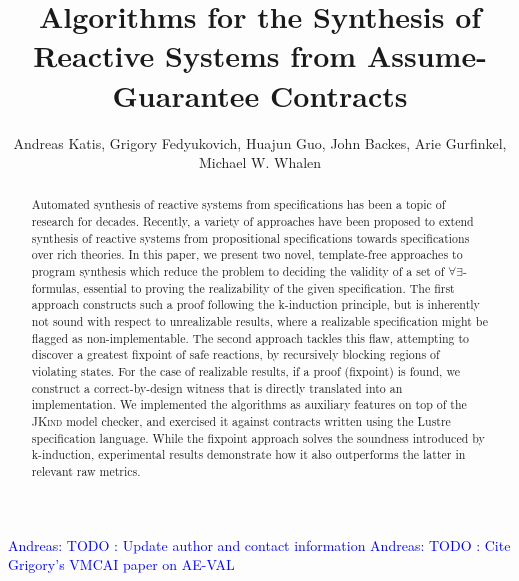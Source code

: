 \documentclass[10pt,conference]{llncs}
\newcommand{\jkind}{\textsc{JKind}\xspace}
\newcommand{\andreas}[1]{\textcolor{blue}{Andreas: #1}}
\newcounter{template}
\begin{document}
\title{Algorithms for the Synthesis of Reactive Systems from Assume-Guarantee Contracts}
\andreas{TODO : Update author and contact information}
\andreas{TODO : Cite Grigory's VMCAI paper on AE-VAL}
\author{Andreas Katis, Grigory Fedyukovich, Huajun Guo,
  John Backes, Arie Gurfinkel, Michael W. Whalen}%
 



\maketitle

\begin{abstract}
Automated synthesis of reactive systems from specifications has been a topic of research for decades.  Recently, a variety of approaches have been proposed to extend synthesis of reactive systems from propositional specifications towards specifications over rich theories.
In this paper, we present two novel, template-free approaches to program synthesis which reduce the problem to deciding the validity of a set of $\forall\exists$-formulas, essential to proving the realizability of the given specification.
The first approach constructs such a proof following the k-induction principle, but is inherently not sound with respect to unrealizable results, where a realizable specification might be flagged as non-implementable. The second approach tackles this flaw, attempting to discover a greatest fixpoint of safe reactions, by recursively blocking regions of violating states. For the case of realizable results, if a proof (fixpoint) is found, we construct a correct-by-design witness that is directly translated into an implementation.
We implemented the algorithms as auxiliary features on top of the \jkind model checker, and exercised it against contracts written using the Lustre specification language.
While the fixpoint approach solves the soundness introduced by k-induction, experimental results demonstrate how it also outperforms the latter in relevant raw metrics.
\end{abstract}
\end{document}
